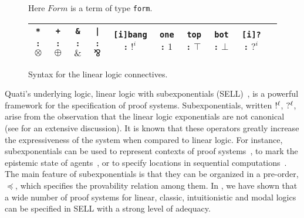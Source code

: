\documentclass{llncs}
\newcommand{\tup}[1]{\langle#1\rangle}
\newcommand{\nbang}[1]{\hbox{$!^{#1}$}}
\newcommand{\nquest}[1]{\hbox{$?^{#1}$}}
\begin{document}
\begin{figure}[t]
{%
}
\vspace{-4mm}
\caption{Here $Form$ is a term of type \texttt{form}.} 
\label{fig:syntax}
\begin{center}
\begin{tabular}{c@{\quad}c@{\quad}c@{\quad}c@{\quad}c@{\quad}c@{\quad}c@{\quad}c@{\quad}c@{\quad}c}
\toprule
\texttt{*} : $\otimes$ & \texttt{+} : $\oplus$ & \texttt{\&} : $\&$ & \texttt{|} : $\bindnasrepma$ & \texttt{[i]bang} : $!^i$ &
\texttt{one} : $1$ &  \texttt{top} : $\top$ & \texttt{bot} : $\bot$ & \texttt{[i]?} : $?^i$ \\
\bottomrule
\end{tabular}
\end{center}
\vspace{-4mm}
\caption{Syntax for the linear logic connectives.}
\label{fig:syntax_ll}
\vspace{-4mm}
\end{figure}

Quati's underlying logic, linear logic with subexponentials
(SELL)~\cite{nigam09ppdp}, is a powerful framework for the specification of proof systems. 
Subexponentials, written $\nbang{\ell}$, $\nquest{\ell}$, arise from the
observation that the linear logic exponentials are not canonical (see
\cite{nigam.jlc} for an extensive discussion). It is known that these operators
greatly increase
the expressiveness of the system when compared to linear logic. For instance,
subexponentials can be used to represent contexts of proof
systems~\cite{nigam.jlc}, to mark the epistemic state of
agents~\cite{nigam12lics}, or to specify locations in sequential
computations~\cite{nigam09ppdp}. 
The main feature of subexponentials is that they can be organized in a pre-order, $\preceq$, which specifies
the provability relation among them. 
In \cite{nigam.jlc}, we have shown that a wide number of proof systems for linear, classic, intuitionistic and 
modal logics can be specified in SELL with a strong level of adequacy. 
\end{document}

